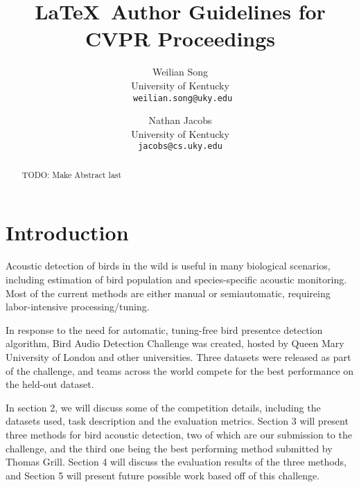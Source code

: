 \documentclass[10pt,twocolumn,letterpaper]{article}
\begin{document}
\title{\LaTeX\ Author Guidelines for CVPR Proceedings}

\author{Weilian Song\\ 
University of Kentucky\\ 
{\tt\small
weilian.song@uky.edu}
\and Nathan Jacobs\\ 
University of Kentucky\\ 
{\tt\small jacobs@cs.uky.edu}
}

\maketitle

\begin{abstract} TODO: Make Abstract last \end{abstract}

\section{Introduction}

Acoustic detection of birds in the wild is useful in many biological
scenarios, including estimation of bird population and species-specific
acoustic monitoring. Most of the current methods are either manual or
semiautomatic, requireing labor-intensive processing/tuning.

In response to the need for automatic, tuning-free bird presentce detection
algorithm, Bird Audio Detection Challenge was created, hosted by Queen Mary
University of London and other universities. Three datasets were released
as part of the challenge, and teams across the world compete for the best
performance on the held-out dataset.

In section 2, we will discuss some of the competition details, including
the datasets used, task description and the evaluation metrics. Section 3
will present three methods for bird acoustic detection, two of which are
our submission to the challenge, and the third one being the best
performing method submitted by Thomas Grill. Section 4 will discuss the
evaluation results of the three methods, and Section 5 will present future
possible work based off of this challenge.
\end{document}
